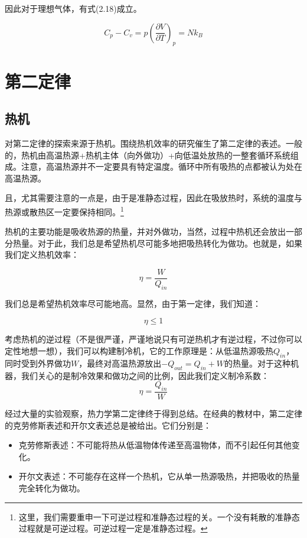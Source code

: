 \documentclass[a4paper, 10pt, openany]{book}%
\begin{document}
因此对于理想气体，有式(2.18)成立。

\begin{equation}C_p-C_v=p\left(\frac{\partial V}{\partial T}\right)_p=Nk_B\end{equation}

\section{第二定律}

\subsection{热机 }
对第二定律的探索来源于热机。围绕热机效率的研究催生了第二定律的表述。一般的，热机由高温热源+热机主体（向外做功）+向低温处放热的一整套循环系统组成。注意，高温热源并不一定要具有特定温度。循环中所有吸热的点都被认为处在高温热源。

且，尤其需要注意的一点是，由于是准静态过程，因此在吸放热时，系统的温度与热源或散热区一定要保持相同。\footnote{这里，我们需要重申一下可逆过程和准静态过程的关。一个没有耗散的准静态过程就是可逆过程。可逆过程一定是准静态过程。}

热机的主要功能是吸收热源的热量，并对外做功，当然，过程中热机还会放出一部分热量。对于此，我们总是希望热机尽可能多地把吸热转化为做功。也就是，如果我们定义热机效率：

\begin{equation}
  \eta =\frac{W}{Q_{in}}
\end{equation}

我们总是希望热机效率尽可能地高。显然，由于第一定律，我们知道：

\begin{equation}
\eta\leq1
\end{equation}

考虑热机的逆过程（不是很严谨，严谨地说只有可逆热机才有逆过程，不过你可以定性地想一想），我们可以构建制冷机，它的工作原理是：从低温热源吸热$Q_{in}$，同时受到外界做功$W$，最终对高温热源放出$-Q_{out}=Q_{in}+W$的热量。对于这种机器，我们关心的是制冷效果和做功之间的比例，因此我们定义制冷系数：
\begin{equation}
  \eta=\frac{Q_{in}}{W}\end{equation}

经过大量的实验观察，热力学第二定律终于得到总结。在经典的教材中，第二定律的克劳修斯表述和开尔文表述总是被给出。它们分别是：

\begin{itemize}
\item 克劳修斯表述：不可能将热从低温物体传递至高温物体，而不引起任何其他变化。

\item 开尔文表述：不可能存在这样一个热机，它从单一热源吸热，并把吸收的热量完全转化为做功。
\end{itemize}
\end{document}
